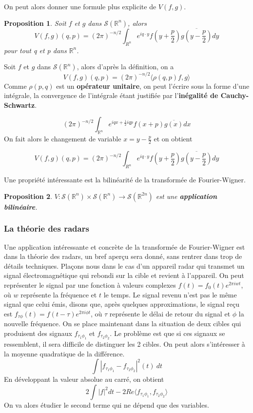 \documentclass[a4paper, 12pt]{report}
\newcommand{\R}{\mathbb{R}} %
\newcommand{\ra}[1][]{\overset{#1}{\rightarrow}} %
\renewcommand{\.}{\cdot} %
\theoremstyle{break}
\newtheorem{proposition}{Proposition}
\theoremstyle{remark}
\theoremstyle{proofstyle}
\begin{document}
On peut alors donner une formule plus explicite de $V(f,g)$.

\begin{proposition}
    Soit $f$ et $g$ dans $\mathcal{S}(\R^n)$, alors
    $$V(f,g)(q,p) = (2 \pi)^{-n/2} \int_{R^n} e^{iq \. y} f\left(y + \frac{p}{2}\right) \overline{g\left(y-\frac{p}{2}\right)}dy$$
    pour tout q et p dans $\R^n$.
\end{proposition}

\begin{preuve}
    Soit $f$ et $g$ dans $\mathcal{S}(\R^n)$, alors d'après la définition, on a
    $$V(f,g)(q,p) = (2 \pi)^{-n/2} \langle \rho(q,p)f,g \rangle$$
    Comme $\rho(p,q)$ est un \textbf{opérateur unitaire}, on peut l'écrire sous la forme d'une intégrale, la convergence de l'intégrale étant justifiée par l'\textbf{inégalité de Cauchy-Schwartz}.

    $$(2 \pi)^{-n/2} \int_{\R^n}e^{iqx+\frac{1}{2}iqp}f(x+p)\overline{g(x)}dx$$
    On fait alors le changement de variable $x = y-\frac{p}{2}$ et on obtient

    $$V(f,g)(q,p) = (2 \pi)^{-n/2} \int_{R^n} e^{iq \. y} f\left(y + \frac{p}{2}\right) \overline{g\left(y-\frac{p}{2}\right)}dy$$

\end{preuve}

Une propriété intéressante est la bilinéarité de la transformée de Fourier-Wigner.
\begin{proposition}
    $V : \mathcal{S} (\R^n) \times \mathcal{S} (\R^n) \ra \mathcal{S} (\R^{2n})$ est une \textbf{application bilinéaire}.
\end{proposition}

\subsubsection{La théorie des radars}
Une application intéressante et concrète de la transformée de Fourier-Wigner est dans la théorie des radars, un bref aperçu sera donné, sans rentrer dans trop de détails techniques.
Plaçons nous dans le cas d'un appareil radar qui transmet un signal électromagnétique qui rebondi sur la cible et revient à l'appareil. On peut représenter le signal par une fonction à valeurs complexes $f(t) = f_0(t) e^{2 \pi i w t}$, où $w$ représente la fréquence et $t$ le temps. Le signal revenu n'est pas le même signal que celui émis, disons que, après quelques approximations, le signal reçu est $f_{\tau \phi}(t) = f(t - \tau) e^{2 \pi i \phi t}$, où $\tau$ représente le délai de retour du signal et $\phi$ la nouvelle fréquence.
On se place maintenant dans la situation de deux cibles qui produisent des signaux $f_{\tau_1 \phi_1}$ et $f_{\tau_2 \phi_2}$. Le problème est que si ces signaux se ressemblent, il sera difficile de distinguer les 2 cibles.
On peut alors s'intéresser à la moyenne quadratique de la différence.
$$\int |f_{\tau_1 \phi_1} - f_{\tau _2 \phi_2}|^2(t) ~dt$$
En développant la valeur absolue au carré, on obtient
$$2 \int |f|^2 dt -2 Re \langle f_{\tau_1 \phi_1} , f_{\tau _2 \phi_2} \rangle$$
On va alors étudier le second terme qui ne dépend que des variables. \vspace{3pt}
\end{document}
